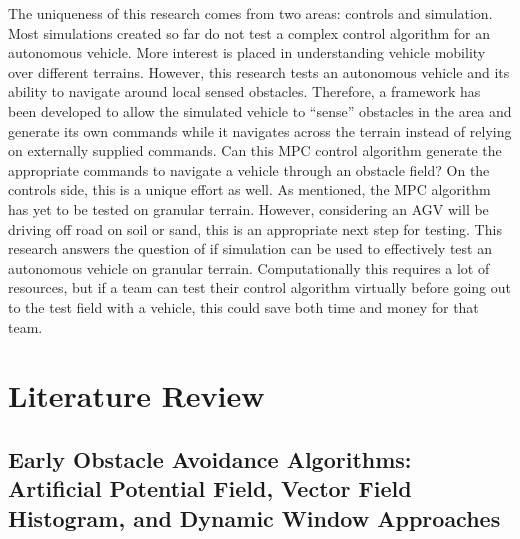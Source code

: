 \documentclass[12pt,onecolumn]{report}
\newcommand{\CHRONO}{{\sffamily{{Chrono}}}}
\begin{document}
The uniqueness of this research comes from two areas: controls and simulation. Most {\CHRONO} simulations created so far do not test a complex control algorithm for an autonomous vehicle. More interest is placed in understanding vehicle mobility over different terrains. However, this research tests an autonomous vehicle and its ability to navigate around local sensed obstacles. Therefore, a framework has been developed to allow the simulated vehicle to “sense” obstacles in the area and generate its own commands while it navigates across the terrain instead of relying on externally supplied commands. Can this MPC control algorithm generate the appropriate commands to navigate a vehicle through an obstacle field? On the controls side, this is a unique effort as well. As mentioned, the MPC algorithm has yet to be tested on granular terrain. However, considering an AGV will be driving off road on soil or sand, this is an appropriate next step for testing. This research answers the question of if simulation can be used to effectively test an autonomous vehicle on granular terrain. Computationally this requires a lot of resources, but if a team can test their control algorithm virtually before going out to the test field with a vehicle, this could save both time and money for that team.


\section{Literature Review}\label{s:LiteratureReview}

\subsection{Early Obstacle Avoidance Algorithms: Artificial Potential Field, Vector Field Histogram, and Dynamic Window Approaches}\label{ss:LitReviewObst1}
\end{document}
